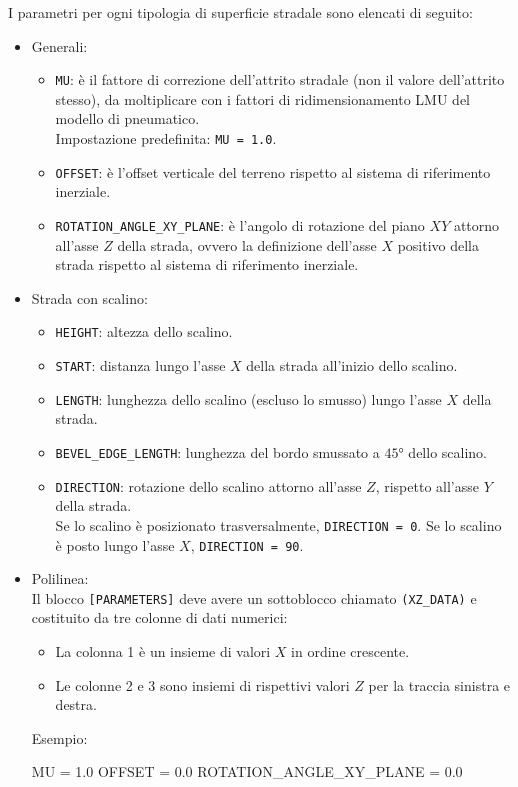 I parametri per ogni tipologia di superficie stradale sono elencati di seguito:
\begin{itemize}
	\item Generali:
	\begin{itemize}
		\item \texttt{MU}: è il fattore di correzione dell'attrito stradale (non il valore dell'attrito stesso), da moltiplicare con i fattori di ridimensionamento LMU del modello di pneumatico.\\
		Impostazione predefinita: \texttt{MU = 1.0}.
		\item \texttt{OFFSET}: è l'offset verticale del terreno rispetto al sistema di riferimento inerziale.
		\item \texttt{ROTATION\_ANGLE\_XY\_PLANE}: è l'angolo di rotazione del piano $XY$ attorno all'asse $Z$ della strada, ovvero la definizione dell'asse $X$ positivo della strada rispetto al sistema di riferimento inerziale.
	\end{itemize}
	\item Strada con scalino:
	\begin{itemize}
		\item \texttt{HEIGHT}: altezza dello scalino.
		\item \texttt{START}: distanza lungo l'asse $X$ della strada all'inizio dello scalino.
		\item \texttt{LENGTH}: lunghezza dello scalino (escluso lo smusso) lungo l'asse $X$ della strada.
		\item \texttt{BEVEL\_EDGE\_LENGTH}: lunghezza del bordo smussato a $45°$ dello scalino.
		\item \texttt{DIRECTION}: rotazione dello scalino attorno all'asse $Z$, rispetto all'asse $Y$ della strada.\\
		Se lo scalino è posizionato trasversalmente, \texttt{DIRECTION = 0}. Se lo scalino è posto lungo l'asse $X$, \texttt{DIRECTION = 90}.
	\end{itemize}
	\item Polilinea:\\
	Il blocco \texttt{[PARAMETERS]} deve avere un sottoblocco chiamato \texttt{(XZ\_DATA)} e costituito da tre colonne di dati numerici:
	\begin{itemize}
		\item La colonna 1 è un insieme di valori $X$ in ordine crescente.
		\item Le colonne 2 e 3 sono insiemi di rispettivi valori $Z$ per la traccia sinistra e destra.
	\end{itemize}
	Esempio:
	\begin{pseudoc}
	[PARAMETERS]
	MU = 1.0
	OFFSET = 0.0
	ROTATION_ANGLE_XY_PLANE = 0.0 
	

\end{pseudoc}
\end{itemize}
